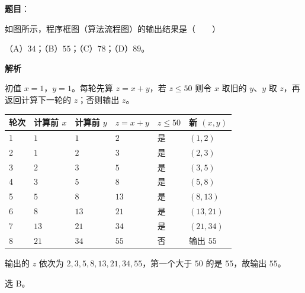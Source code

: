 \begin{answer}

\textbf{题目}：

如图所示，程序框图（算法流程图）的输出结果是\mbox{（　　）}

（A）$34$；（B）$55$；（C）$78$；（D）$89$。
\nopagebreak[4]
\begin{center}\end{center}
\nopagebreak[4]
\textbf{解析}

初值 $x=1$，$y=1$。每轮先算 $z=x+y$，若 $z\leqslant50$ 则令 $x$ 取旧的 $y$、$y$ 取 $z$，再返回计算下一轮的 $z$；否则输出 $z$。

\begin{center}
\begin{tabular}{llllll}
\toprule
轮次 & 计算前 $x$ & 计算前 $y$ & $z=x+y$ & $z\leqslant50$ & 新 $(x,y)$ \\
\midrule
1 & $1$ & $1$ & $2$ & 是 & $(1,2)$ \\
2 & $1$ & $2$ & $3$ & 是 & $(2,3)$ \\
3 & $2$ & $3$ & $5$ & 是 & $(3,5)$ \\
4 & $3$ & $5$ & $8$ & 是 & $(5,8)$ \\
5 & $5$ & $8$ & $13$ & 是 & $(8,13)$ \\
6 & $8$ & $13$ & $21$ & 是 & $(13,21)$ \\
7 & $13$ & $21$ & $34$ & 是 & $(21,34)$ \\
8 & $21$ & $34$ & $55$ & 否 & 输出 $55$ \\
\bottomrule
\end{tabular}
\end{center}

输出的 $z$ 依次为 $2,3,5,8,13,21,34,55$，第一个大于 $50$ 的是 $55$，故输出 $55$。

选 B。


\end{answer}
